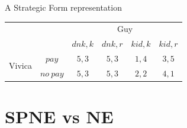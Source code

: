 \documentclass{beamer}
\theoremstyle{plain}
\begin{document}

\begin{frame}{A Strategic Form representation}
  \begin{table}[h]
  \centering
    \begin{tabular}{cc|c|c|c|c|}
	  	& \multicolumn{1}{c}{} & \multicolumn{4}{c}{Guy}\\
      & \multicolumn{1}{c}{} & \multicolumn{1}{c}{$dnk,k$}  & \multicolumn{1}{c}{$dnk,r$} & \multicolumn{1}{c}{$kid,k$} & \multicolumn{1}{c}{$kid,r$} \\\cline{3-6}
      \multirow{2}{*}{Vivica}  & $pay$ & $5,3$ & $5,3$ & $1,4$ & $3,5$ \\\cline{3-6}
      & $no~pay$ & $5,3$ & $5,3$ & $2,2$ & $4,1$ \\\cline{3-6}
	  \end{tabular}

  \end{table}
\end{frame}

\section{SPNE vs NE}


\end{document}
